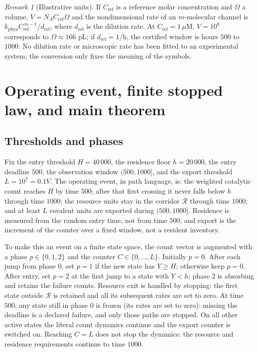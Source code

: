 \documentclass[11pt,a4paper]{article}
\theoremstyle{plain}
\theoremstyle{definition}
\theoremstyle{remark}
\newtheorem{remark}[theorem]{Remark}
\newcommand{\R}{\mathcal R}
\begin{document}
\begin{remark}[Illustrative units]\label{rem:units}
If $C_{\mathrm{ref}}$ is a reference molar concentration and $\Omega$ a volume, $V=N_A C_{\mathrm{ref}}\Omega$ and the nondimensional rate of an $m$-molecular channel is $k_{\mathrm{phys}}C_{\mathrm{ref}}^{\,m-1}/d_{\mathrm{ref}}$, where $d_{\mathrm{ref}}$ is the dilution rate. At $C_{\mathrm{ref}}=1\,\mu$M, $V=10^8$ corresponds to $\Omega\approx166$ pL; if $d_{\mathrm{ref}}=1/\mathrm{h}$, the certified window is hours $500$ to $1000$. No dilution rate or microscopic rate has been fitted to an experimental system; the conversion only fixes the meaning of the symbols.
\end{remark}

\section{Operating event, finite stopped law, and main theorem}\label{sec:law}

\subsection{Thresholds and phases}

Fix the entry threshold $H=40\,000$, the residence floor $h=20\,000$, the entry deadline $500$, the observation window $(500,1000]$, and the export threshold $L=10^7=0.1V$. The operating event, in path language, is: the weighted catalytic count reaches $H$ by time $500$; after that first crossing it never falls below $h$ through time $1000$; the resource units stay in the corridor $\R$ through time $1000$; and at least $L$ covalent units are exported during $(500,1000]$. Residence is measured from the random entry time, not from time $500$, and export is the increment of the counter over a fixed window, not a resident inventory.

To make this an event on a finite state space, the count vector is augmented with a phase $p\in\{0,1,2\}$ and the counter $C\in\{0,\dots,L\}$. Initially $p=0$. After each jump from phase $0$, set $p=1$ if the new state has $Y\ge H$; otherwise keep $p=0$. After entry, set $p=2$ at the first jump to a state with $Y<h$; phase $2$ is absorbing and retains the failure counts. Resource exit is handled by stopping: the first state outside $\R$ is retained and all its subsequent rates are set to zero. At time $500$, any state still in phase $0$ is frozen (its rates are set to zero): missing the deadline is a declared failure, and only those paths are stopped. On all other active states the literal count dynamics continue and the export counter is switched on. Reaching $C=L$ does not stop the dynamics: the resource and residence requirements continue to time $1000$.
\end{document}
